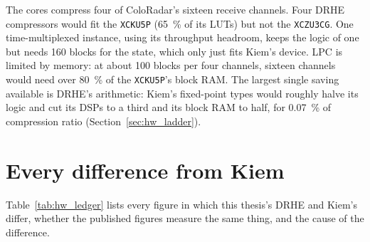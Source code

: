 The cores compress four of ColoRadar's sixteen receive channels. Four DRHE
compressors would fit the \texttt{XCKU5P} (\SI{65}{\percent} of its LUTs) but
not the \texttt{XCZU3CG}. One time-multiplexed instance, using its throughput
headroom, keeps the logic of one but needs 160 blocks for the state, which only
just fits Kiem's device. LPC is limited by memory: at about 100 blocks per four
channels, sixteen channels would need over \SI{80}{\percent} of the
\texttt{XCKU5P}'s block RAM. The largest single saving available is DRHE's
arithmetic: Kiem's fixed-point types would roughly halve its logic and cut its
DSPs to a third and its block RAM to half, for \SI{0.07}{\percent} of
compression ratio (Section~\ref{sec:hw_ladder}).

\section{Every difference from Kiem}
\label{sec:hw_ledger}

Table~\ref{tab:hw_ledger} lists every figure in which this thesis's DRHE and
Kiem's differ, whether the published figures measure the same thing, and the
cause of the difference.


